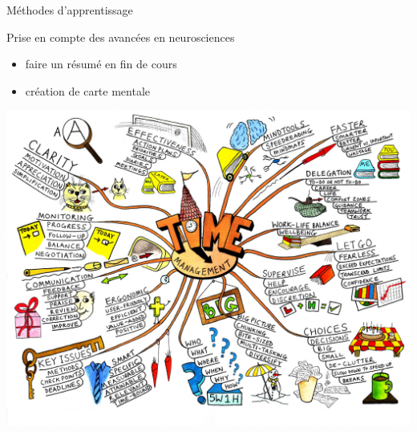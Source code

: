 \begin{frame}{Méthodes d'apprentissage}
  \begin{block}{Prise en compte des avancées en neurosciences}
    \begin{itemize}
    \item faire un résumé en fin de cours
    \item création de carte mentale \\[10pt]
    \end{itemize}
  \end{block}
    
  \begin{center}
    \includegraphics[width=.6\textwidth]{../resources/illustrations/mindmap.jpg}
  \end{center}

\end{frame}
